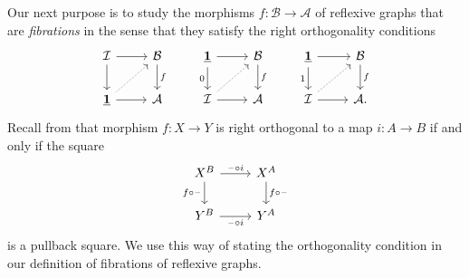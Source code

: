 Our next purpose is to study the morphisms $f:\mathcal{B}\to\mathcal{A}$ of reflexive graphs that are \emph{fibrations} in the sense that they satisfy the right orthogonality conditions
\begin{equation*}
\begin{tikzcd}
\mathcal{I} \arrow[r] \arrow[d] & \mathcal{B} \arrow[d,"f"] & \unit \arrow[d,swap,"0"] \arrow[r] & \mathcal{B} \arrow[d,"f"] & \unit \arrow[d,swap,"1"] \arrow[r] & \mathcal{B} \arrow[d,"f"] \\
\unit \arrow[ur,densely dotted] \arrow[r] & \mathcal{A} & \mathcal{I} \arrow[ur,densely dotted] \arrow[r] & \mathcal{A} & \mathcal{I} \arrow[ur,densely dotted] \arrow[r] & \mathcal{A}.
\end{tikzcd}
\end{equation*}
Recall from \cite{AnelBiedermanFinsterJoyal} that morphism $f:X\to Y$ is right orthogonal to a map $i:A\to B$ if and only if the square
\begin{equation*}
\begin{tikzcd}
X^B \arrow[r,"\blank\circ i"] \arrow[d,swap,"f\circ \blank"] & X^A \arrow[d,"f\circ \blank"] \\
Y^B \arrow[r,swap,"\blank\circ i"] & Y^A
\end{tikzcd}
\end{equation*}
is a pullback square. We use this way of stating the orthogonality condition in our definition of fibrations of reflexive graphs.

